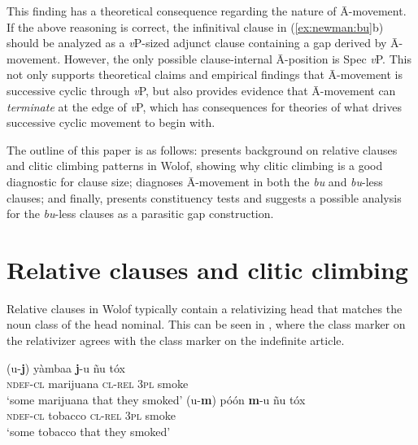 \documentclass[output=paper]{langscibook}
\begin{document}
This finding has a theoretical consequence regarding the nature of \={A}-move\-ment. If the above reasoning is correct, the infinitival clause in (\ref{ex:newman:bu}b) should be analyzed as a \textit{v}P-sized adjunct clause containing a gap derived by \={A}-movement. However, the only possible clause-internal \={A}-position is Spec \textit{v}P. This not only supports theoretical claims and empirical findings that \={A}-movement is successive cyclic through \textit{v}P, but also provides evidence that \={A}-movement can \emph{terminate} at the edge of \textit{v}P, which has consequences for theories of what drives successive cyclic movement to begin with.



The outline of this paper is as follows:  presents background on relative clauses and clitic climbing patterns in Wolof, showing why clitic climbing is a good diagnostic for clause size;   diagnoses \={A}-movement in both the \emph{bu} and \emph{bu}-less clauses; and finally,  presents constituency tests and suggests a possible analysis for the \emph{bu}-less clauses as a parasitic gap construction.


\section{Relative clauses and clitic climbing} \label{sec:newman:cc}



Relative clauses in Wolof typically contain a relativizing head that matches the noun class of the head nominal. This can be seen in , where the class marker on the relativizer agrees with the class marker on the indefinite article.

\begin{exe}
    \ex \label{ex:newman:relt} \citep[104--106]{torrence:2013}\begin{xlist}
        \ex 
        \gll (u-\textbf{j}) y\`ambaa \textbf{j}-u \~nu t\'ox\\
        \textsc{ndef-cl} marijuana \textsc{cl-rel} \textsc{3pl} smoke\\
        \glt `some marijuana that they smoked'
        \ex
        \gll (u-\textbf{m}) p\'o\'on \textbf{m}-u \~nu t\'ox\\
        \textsc{ndef-cl} tobacco \textsc{cl-rel} \textsc{3pl} smoke\\
        \glt `some tobacco that they smoked'
    \end{xlist}
\end{exe}
\end{document}
